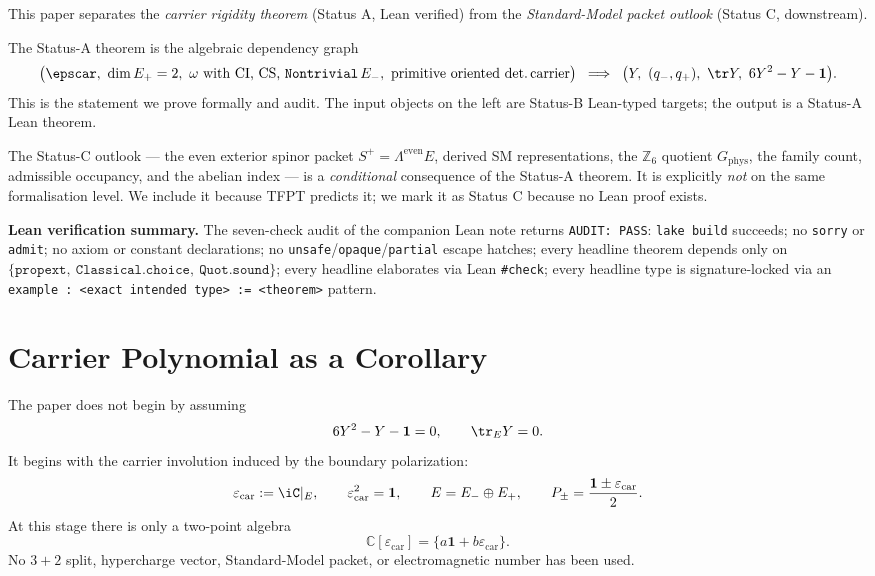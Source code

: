 This paper separates the \emph{carrier rigidity theorem}
(Status A, Lean verified) from the \emph{Standard-Model packet
outlook} (Status C, downstream).

The Status-A theorem is the algebraic dependency graph
\[
\big(\epscar,\ \dim E_+ = 2,\ \omega \text{ with CI, CS, } \texttt{Nontrivial}\,E_-,\ \text{primitive oriented det.\,carrier}\big)
\;\;\Longrightarrow\;\;
\big(Y,\ (q_-, q_+),\ \tr Y,\ 6 Y^2 - Y - \mathbf 1\big).
\]
This is the statement we prove formally and audit. The
input objects on the left are Status-B Lean-typed targets;
the output is a Status-A Lean theorem.

The Status-C outlook --- the even exterior spinor packet
$S^+ = \Lambda^{\mathrm{even}} E$, derived SM representations,
the $\mathbb Z_6$ quotient $G_{\mathrm{phys}}$, the family
count, admissible occupancy, and the abelian index --- is a
\emph{conditional} consequence of the Status-A theorem. It is
explicitly \emph{not} on the same formalisation level. We
include it because TFPT predicts it; we mark it as Status C
because no Lean proof exists.

\noindent
\textbf{Lean verification summary.}
The seven-check audit of the companion Lean note returns
\texttt{AUDIT:~PASS}: \texttt{lake build} succeeds; no
\texttt{sorry} or \texttt{admit}; no axiom or constant
declarations; no \texttt{unsafe}/\texttt{opaque}/\texttt{partial}
escape hatches; every headline theorem depends only on
$\{\texttt{propext},\ \texttt{Classical.choice},\ \texttt{Quot.sound}\}$;
every headline elaborates via Lean \texttt{\#check}; every
headline type is signature-locked via an
\texttt{example : <exact intended type> := <theorem>} pattern.

\section{Carrier Polynomial as a Corollary}

The paper does not begin by assuming
\[
6Y^2-Y-\mathbf 1=0,\qquad \tr_EY=0.
\]
It begins with the carrier involution induced by the boundary polarization:
\[
\varepsilon_{\mathrm{car}}:=\iC|_E,
\qquad
\varepsilon_{\mathrm{car}}^2=\mathbf 1,
\qquad
E=E_-\oplus E_+,
\qquad
P_\pm=\frac{\mathbf 1\pm\varepsilon_{\mathrm{car}}}{2}.
\]
At this stage there is only a two-point algebra
\[
\mathbb C[\varepsilon_{\mathrm{car}}]=\{a\mathbf 1+b\varepsilon_{\mathrm{car}}\}.
\]
No $3+2$ split, hypercharge vector, Standard-Model packet, or electromagnetic number has been
used.

